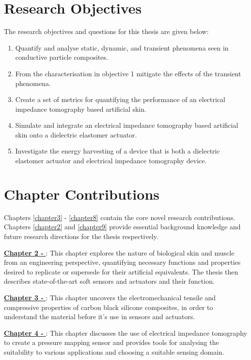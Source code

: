 \section{Research Objectives}
The research objectives and questions for this thesis are given below:
\begin{enumerate}
	\item Quantify and analyse static, dynamic, and transient phenomena seen in conductive particle composites.
	\item From the characterisation in objective 1 mitigate the effects of the transient phenomena.
	\item Create a set of metrics for quantifying the performance of an electrical impedance tomography based artificial skin.
	\item Simulate and integrate an electrical impedance tomography based artificial skin onto a dielectric elastomer actuator.
	\item Investigate the energy harvesting of a device that is both a dielectric elastomer actuator and electrical impedance tomography device.
\end{enumerate}

\section{Chapter Contributions}
Chapters \ref{chapter3} - \ref{chapter8} contain the core novel research contributions. Chapters \ref{chapter2} and \ref{chapter9} provide essential background knowledge and future research directions for the thesis respectively.

\hyperref[chapter2]{\textbf{Chapter 2 - \chapiiname}}: This chapter explores the nature of biological skin and muscle from an engineering perspective, quantifying necessary functions and properties desired to replicate or supersede for their artificial equivalents. The thesis then describes state-of-the-art soft sensors and actuators and their function.

\hyperref[chapter3]{\textbf{Chapter 3 - \chapiiiname}}: This chapter uncovers the electromechanical tensile and compressive properties of carbon black silicone composites, in order to understand the material before it's use in sensors and actuators.

\hyperref[chapter4]{\textbf{Chapter 4 - \chapivname}}: This chapter discusses the use of electrical impedance tomography to create a pressure mapping sensor and provides tools for analysing the suitability to various applications and choosing a suitable sensing domain.

